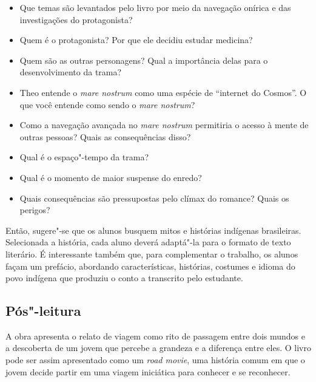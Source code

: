 \documentclass[12pt]{extarticle}
\begin{document}
\begin{itemize} 
\item Que temas são levantados pelo livro por meio da navegação
    onírica e das investigações do protagonista?

\item Quem é o protagonista? Por que ele decidiu estudar medicina?

\item Quem são as outras personagens? Qual a importância delas para o desenvolvimento da trama?

\item Theo entende o \emph{mare nostrum} como uma espécie de ``internet do Cosmos''. O que você entende como sendo o \emph{mare nostrum}? 

\item Como a navegação avançada no \emph{mare nostrum} permitiria o acesso à mente de outras pessoas? Quais as consequências disso?

\item Qual é o espaço"-tempo da trama?

\item Qual é o momento de maior suspense do enredo?

\item Quais consequências são pressupostas pelo clímax do romance? Quais os perigos?

 \end{itemize}

Então, sugere"-se que os alunos busquem mitos e histórias indígenas brasileiras. Selecionada a história, cada aluno deverá adaptá"-la para o formato de texto literário. É interessante também que, para complementar o trabalho, os alunos façam um prefácio, abordando características, histórias, costumes e idioma do povo indígena que produziu o conto a transcrito pelo
estudante.

\subsection{Pós"-leitura}


A obra apresenta o relato de viagem como rito de passagem entre dois mundos e a descoberta de um jovem que percebe a grandeza e a diferença entre eles. O livro pode ser assim apresentado como um \textit{road movie}, uma história comum em que o jovem decide partir em uma viagem iniciática para conhecer e se reconhecer.
\end{document}

